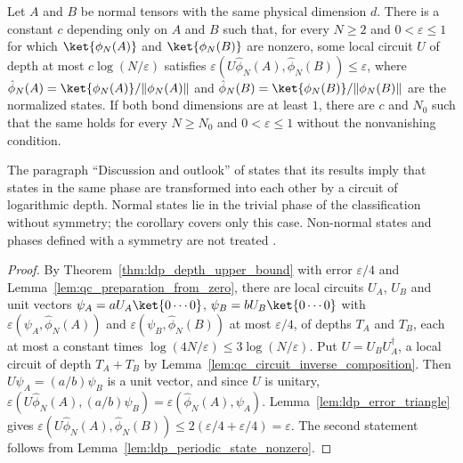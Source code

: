 \begin{corollary}
    \label{cor:ldp_normal_states_circuit}
    \leanok
    Let $A$ and $B$ be normal tensors with the same physical dimension $d$.
    There is a constant $c$ depending only on $A$ and $B$ such that, for every
    $N\ge2$ and $0<\varepsilon\le1$ for which $\ket{\phi_N(A)}$ and
    $\ket{\phi_N(B)}$ are nonzero, some local circuit $U$ of depth at most
    $c\log(N/\varepsilon)$ satisfies
    $\varepsilon(U\hat\phi_N(A),\hat\phi_N(B))\le\varepsilon$, where
    $\hat\phi_N(A)=\ket{\phi_N(A)}/\lVert\phi_N(A)\rVert$ and
    $\hat\phi_N(B)=\ket{\phi_N(B)}/\lVert\phi_N(B)\rVert$ are the normalized
    states. If both bond dimensions are at least
    $1$, there are $c$ and $N_0$ such that the same holds for every
    $N\ge N_0$ and $0<\varepsilon\le1$ without the nonvanishing condition.

    The paragraph ``Discussion and outlook'' of \cite{Malz2024Preparation}
    states that its results imply that states in the same phase are
    transformed into each other by a circuit of logarithmic depth. Normal
    states lie in the trivial phase of the classification without symmetry;
    the corollary covers only this case. Non-normal states and phases defined
    with a symmetry are not treated
    \cite{gap:mswc24_same_phase_circuit_normal_case}.
\end{corollary}
\begin{proof}
    \leanok
    By Theorem~\ref{thm:ldp_depth_upper_bound} with error $\varepsilon/4$ and
    Lemma~\ref{lem:qc_preparation_from_zero}, there are local circuits $U_A$,
    $U_B$ and unit vectors $\psi_A=aU_A\ket{0\cdots0}$,
    $\psi_B=bU_B\ket{0\cdots0}$ with $\varepsilon(\psi_A,\hat\phi_N(A))$ and
    $\varepsilon(\psi_B,\hat\phi_N(B))$ at most $\varepsilon/4$, of depths
    $T_A$ and $T_B$, each at most a constant times
    $\log(4N/\varepsilon)\le3\log(N/\varepsilon)$. Put $U=U_BU_A^\dagger$, a
    local circuit of depth $T_A+T_B$ by
    Lemma~\ref{lem:qc_circuit_inverse_composition}. Then $U\psi_A=(a/b)\psi_B$ is a unit
    vector, and since $U$ is unitary,
    $\varepsilon(U\hat\phi_N(A),(a/b)\psi_B)=\varepsilon(\hat\phi_N(A),\psi_A)$.
    Lemma~\ref{lem:ldp_error_triangle} gives
    $\varepsilon(U\hat\phi_N(A),\hat\phi_N(B))\le2(\varepsilon/4+\varepsilon/4)
        =\varepsilon$. The second statement follows from
    Lemma~\ref{lem:ldp_periodic_state_nonzero}.
\end{proof}

